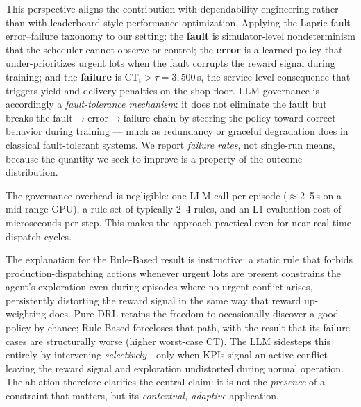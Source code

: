 \documentclass[10pt]{article}
\begin{document}
This perspective aligns the contribution with dependability engineering
\parencite{avizienis2004} rather than with leaderboard-style performance optimization.
Applying the Laprie fault--error--failure taxonomy to our setting:
the \textbf{fault} is simulator-level nondeterminism that the scheduler cannot
observe or control; the \textbf{error} is a learned policy that under-prioritizes
urgent lots when the fault corrupts the reward signal during training; and the
\textbf{failure} is $\overline{\mathrm{CT}}_i > \tau = 3{,}500$\,s, the
service-level consequence that triggers yield and delivery penalties on the shop
floor. LLM governance is accordingly a \emph{fault-tolerance mechanism}: it does
not eliminate the fault but breaks the fault$\to$error$\to$failure chain by
steering the policy toward correct behavior during training --- much as redundancy
or graceful degradation does in classical fault-tolerant systems. We report
\emph{failure rates}, not single-run means, because the quantity we seek to
improve is a property of the outcome distribution.

The governance overhead is negligible: one LLM call per episode ($\approx$2--5\,s
on a mid-range GPU), a rule set of typically 2--4 rules, and an L1 evaluation
cost of microseconds per step. This makes the approach practical even for
near-real-time dispatch cycles.

The explanation for the Rule-Based result is instructive: a static rule that forbids production-dispatching
actions whenever urgent lots are present constrains the agent's exploration even
during episodes where no urgent conflict arises, persistently distorting the
reward signal in the same way that reward up-weighting does.
Pure DRL retains the freedom to occasionally discover a good policy by chance;
Rule-Based forecloses that path, with the result that its failure cases are
structurally worse (higher worst-case CT). The LLM sidesteps this entirely by
intervening \emph{selectively}---only when KPIs signal an active conflict---leaving
the reward signal and exploration undistorted during normal operation. The ablation
therefore clarifies the central claim: it is not the \emph{presence} of a
constraint that matters, but its \emph{contextual, adaptive} application.
\end{document}
